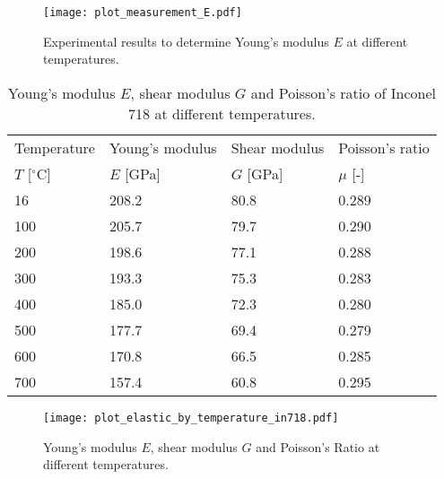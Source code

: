 \begin{figure}[!htp]
\centering
\texttt{[image: plot\_measurement\_E.pdf]}
\caption{Experimental results to determine Young's modulus $E$ at different temperatures.}
\label{Fig:E_Test_Show}
\end{figure}

\begin{table}[htbp]
  \centering
  \caption{Young's modulus $E$, shear modulus $G$ and Poisson's ratio of Inconel 718 at different temperatures.}
    \begin{tabular}{p{3cm}<{\centering}p{3cm}<{\centering}p{3cm}<{\centering}p{3cm}<{\centering}}
    \toprule
    Temperature & Young's modulus & Shear modulus & Poisson's ratio \\
    $T$ [$^{\circ}$C] & $E$ [GPa] & $G$ [GPa] & $\mu$ [-] \\
    \midrule
    16    & 208.2  & 80.8  & 0.289 \\
    100   & 205.7  & 79.7  & 0.290 \\
    200   & 198.6  & 77.1  & 0.288 \\
    300   & 193.3  & 75.3  & 0.283 \\
    400   & 185.0  & 72.3  & 0.280 \\
    500   & 177.7  & 69.4  & 0.279 \\
    600   & 170.8  & 66.5  & 0.285 \\
    700   & 157.4  & 60.8  & 0.295 \\
    \bottomrule
    \end{tabular}%
  \label{Tab:EandG}%
\end{table}%

\begin{figure}[!htp]
  \centering
  \texttt{[image: plot\_elastic\_by\_temperature\_in718.pdf]}
  \caption{Young's modulus $E$, shear modulus $G$ and Poisson's Ratio at different temperatures.}
  \label{Fig:plot_elastic_by_temperature_in718}
\end{figure}

